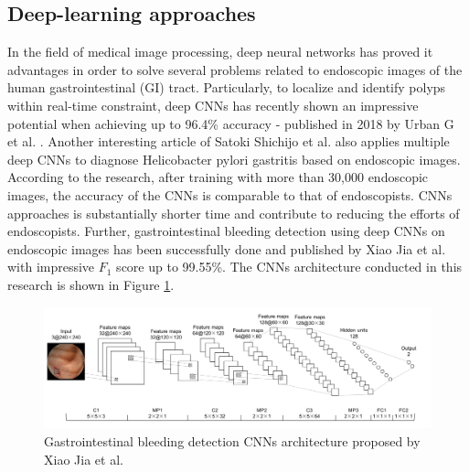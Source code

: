 \subsection{Deep-learning approaches}
In the field of medical image processing, deep neural networks has proved it advantages in order to solve several problems related to endoscopic images of the human gastrointestinal (GI) tract. Particularly, to localize and identify polyps within real-time constraint, deep CNNs has recently shown an impressive potential when achieving up to 96.4\% accuracy - published in 2018 by Urban G et al. \cite{urban_tripathi_alkayali_mittal_jalali_karnes_baldi_2018}. Another interesting article of Satoki Shichijo et al. \cite{Shichijo2017} also applies multiple deep CNNs to diagnose Helicobacter pylori gastritis based on endoscopic images. According to the research, after training with more than 30,000 endoscopic images, the accuracy of the CNNs is comparable to that of endoscopists. CNNs approaches is substantially shorter time and contribute to reducing the efforts of endoscopists. Further, gastrointestinal bleeding detection using deep CNNs on endoscopic images has been successfully done and published by Xiao Jia et al. \cite{jia_meng_2016} with impressive $F_1$ score up to 99.55\%. The CNNs architecture conducted in this research is shown in Figure \ref{fig:cnns_bleeding}.

\begin{figure}[thb]
    \centering
    \includegraphics[width=\textwidth]{endoscopy_resources/cnns_bleeding_detection.png}
    \caption{Gastrointestinal bleeding detection CNNs architecture proposed by Xiao Jia et al.  \cite{jia_meng_2016}}
    \label{fig:cnns_bleeding}
\end{figure}


